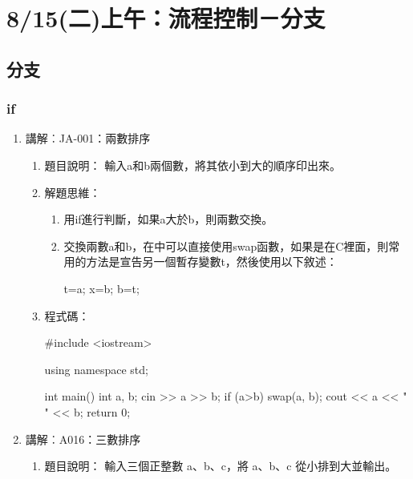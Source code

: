 
\section{8/15(二)上午：流程控制－分支}

	

\subsection{分支}

\subsubsection{if}
\begin{enumerate}
	\item 講解︰JA-001：兩數排序
		\begin{enumerate}
			\item 題目說明：
			\subitem 輸入a和b兩個數，將其依小到大的順序印出來。
			
			\item 解題思維：
			\begin{enumerate}
				\item 用if進行判斷，如果a大於b，則兩數交換。
				
				\item 交換兩數a和b，在\cc{}中可以直接使用swap函數，如果是在C裡面，則常用的方法是宣告另一個暫存變數t，然後使用以下敘述：
				\begin{inside}
				t=a; x=b; b=t;
				\end{inside}
			\end{enumerate}
			\item 程式碼：
			\begin{cppcode}
				#include <iostream>
				
				using namespace std;
				
				int main()
				{
					int a, b;
					cin >> a >> b;
					if (a>b) swap(a, b);
					cout << a << " " << b;
					return 0;
				}
					
			\end{cppcode}
		\end{enumerate}
	\item 講解︰A016：三數排序
		\begin{enumerate}
			\item 題目說明：
			\subitem 輸入三個正整數 a、b、c，將 a、b、c 從小排到大並輸出。
			

\end{enumerate}
\end{enumerate}
